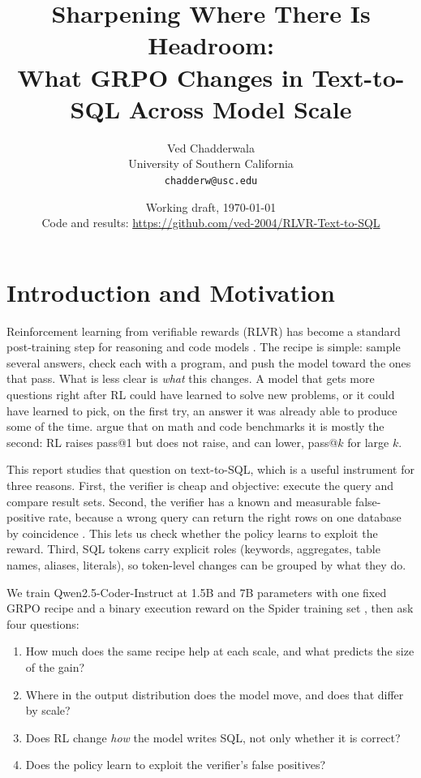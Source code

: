 \documentclass[11pt]{article}
\title{Sharpening Where There Is Headroom:\\
What GRPO Changes in Text-to-SQL Across Model Scale}
\author{Ved Chadderwala\\
University of Southern California\\
\texttt{chadderw@usc.edu}}
\date{Working draft, \today \\ \small Code and results: \url{https://github.com/ved-2004/RLVR-Text-to-SQL}}
\begin{document}
\maketitle

\section{Introduction and Motivation}

Reinforcement learning from verifiable rewards (RLVR) has become a standard
post-training step for reasoning and code models
\citep{shao2024deepseekmath,lambert2024tulu3,guo2025deepseekr1}. The recipe is
simple: sample several answers, check each with a program, and push the model
toward the ones that pass. What is less clear is \emph{what} this changes. A
model that gets more questions right after RL could have learned to solve new
problems, or it could have learned to pick, on the first try, an answer it was
already able to produce some of the time. \citet{yue2025limit} argue that on
math and code benchmarks it is mostly the second: RL raises pass@1 but does not
raise, and can lower, pass@$k$ for large $k$.

This report studies that question on text-to-SQL, which is a useful instrument
for three reasons. First, the verifier is cheap and objective: execute the
query and compare result sets. Second, the verifier has a known and measurable
false-positive rate, because a wrong query can return the right rows on one
database by coincidence \citep{zhong2020testsuite}. This lets us check whether
the policy learns to exploit the reward. Third, SQL tokens carry explicit roles
(keywords, aggregates, table names, aliases, literals), so token-level changes
can be grouped by what they do.

We train Qwen2.5-Coder-Instruct at 1.5B and 7B parameters \citep{hui2024qwen25coder}
with one fixed GRPO recipe and a binary execution reward on the Spider training
set \citep{yu2018spider}, then ask four questions:
\begin{enumerate}
  \item How much does the same recipe help at each scale, and what predicts the size of the gain?
  \item Where in the output distribution does the model move, and does that differ by scale?
  \item Does RL change \emph{how} the model writes SQL, not only whether it is correct?
  \item Does the policy learn to exploit the verifier's false positives?
\end{enumerate}
\end{document}
